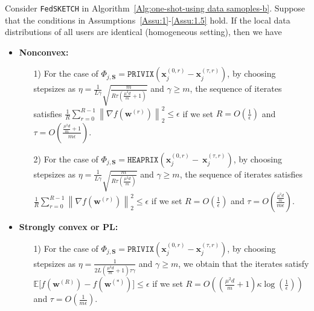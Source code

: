 \begin{theorem}\label{thm:homog_case}
 Consider \texttt{FedSKETCH} in Algorithm~\ref{Alg:one-shot-using data samoples-b}. Suppose that the conditions in Assumptions~\ref{Assu:1}-\ref{Assu:1.5} hold. If the local data distributions of all users are identical (homogeneous setting), then we have  
 \begin{itemize}
     \item \textbf{Nonconvex:}  
     \begin{itemize}
         \item [1)] For the case of $\Phi_{j,\mathbf{S}}=\texttt{PRIVIX}\left(\boldsymbol{x}_j^{(0,r)}-\boldsymbol{x}_j^{(\tau,r)}\right)$, by choosing stepsizes as $\eta=\frac{1}{L\gamma}\sqrt{\frac{m}{R\tau\left(\frac{\mu^2d}{m}+1\right)}}$ and $\gamma\geq m$, the sequence of iterates satisfies  $\frac{1}{R}\sum_{r=0}^{R-1}\left\|\nabla f({\boldsymbol{w}}^{(r)})\right\|_2^2\leq {\epsilon}$ if we set
     $R=O\left(\frac{1}{\epsilon}\right)$ and $ \tau=O\left(\frac{\frac{\mu^2d}{m}+1}{{m}\epsilon}\right)$.
         \item[2)] For the case of 
$  \Phi_{j,\mathbf{S}}=\texttt{HEAPRIX}\left(\boldsymbol{x}_j^{(0,r)}-~{\boldsymbol{x}}_{j}^{(\tau,r)}\right)$, by choosing stepsizes as $\eta=\frac{1}{L\gamma}\sqrt{\frac{m}{R\tau\left(\frac{\mu^2d}{m}\right)}}$ and $\gamma\geq m$, the sequence of iterates satisfies  $\frac{1}{R}\sum_{r=0}^{R-1}\left\|\nabla f({\boldsymbol{w}}^{(r)})\right\|_2^2\leq {\epsilon}$ if we set
     $R=O\left(\frac{1}{\epsilon}\right)$ and $ \tau=O\left(\frac{\frac{\mu^2d}{m}}{{m}\epsilon}\right)$. 
     \end{itemize}
     
     \item \textbf{Strongly convex or PL:}
      \begin{itemize}
          \item[1)] For the case of $\Phi_{j,\mathbf{S}}=\texttt{PRIVIX}\left(\boldsymbol{x}_j^{(0,r)}-\boldsymbol{x}_j^{(\tau,r)}\right)$, by choosing stepsizes as $\eta=\frac{1}{2L\left(\frac{\mu^2d}{m}+1\right)\tau\gamma}$ and $\gamma\geq m$, we obtain that the iterates satisfy $\mathbb{E}\Big[f({\boldsymbol{w}}^{(R)})-f({\boldsymbol{w}}^{(*)})\Big]\leq \epsilon$ if  we set
     $R=O\left(\left(\frac{\mu^2d}{m}+1\right)\kappa\log\left(\frac{1}{\epsilon}\right)\right)$ and $ \tau=O\left(\frac{1}{m\epsilon}\right)$.
          

\end{itemize}
\end{itemize}
\end{theorem}

